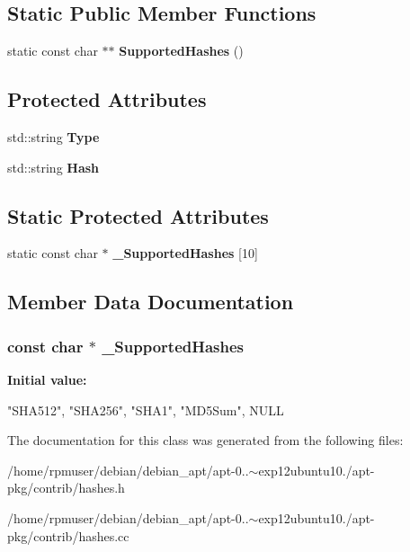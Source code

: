 \subsection*{\-Static \-Public \-Member \-Functions}
\begin{DoxyCompactItemize}
\item 
static const char $\ast$$\ast$ {\bfseries \-Supported\-Hashes} ()\label{classHashString_a9c5f43c8485723811929e03c8c0a00bb}

\end{DoxyCompactItemize}
\subsection*{\-Protected \-Attributes}
\begin{DoxyCompactItemize}
\item 
std\-::string {\bfseries \-Type}\label{classHashString_a6fcef4329ae329f0b7b6b8d739be7121}

\item 
std\-::string {\bfseries \-Hash}\label{classHashString_a417a37f1811657fbb9c545558b6de2f7}

\end{DoxyCompactItemize}
\subsection*{\-Static \-Protected \-Attributes}
\begin{DoxyCompactItemize}
\item 
static const char $\ast$ {\bfseries \-\_\-\-Supported\-Hashes} [10]
\end{DoxyCompactItemize}


\subsection{\-Member \-Data \-Documentation}
\subsubsection[{\-\_\-\-Supported\-Hashes}]{\setlength{\rightskip}{0pt plus 5cm}const char $\ast$ \-\_\-\-Supported\-Hashes\hspace{0.3cm}{\ttfamily  [static, protected]}}\label{classHashString_a16337c9c40044ea213380f352e935362}
{\bfseries \-Initial value\-:}
\begin{DoxyCode}
 
{
   "SHA512", "SHA256", "SHA1", "MD5Sum", NULL
}
\end{DoxyCode}


\-The documentation for this class was generated from the following files\-:\begin{DoxyCompactItemize}
\item 
/home/rpmuser/debian/debian\-\_\-apt/apt-\/0..$\sim$exp12ubuntu10./apt-\/pkg/contrib/hashes.\-h\item 
/home/rpmuser/debian/debian\-\_\-apt/apt-\/0..$\sim$exp12ubuntu10./apt-\/pkg/contrib/hashes.\-cc\end{DoxyCompactItemize}
